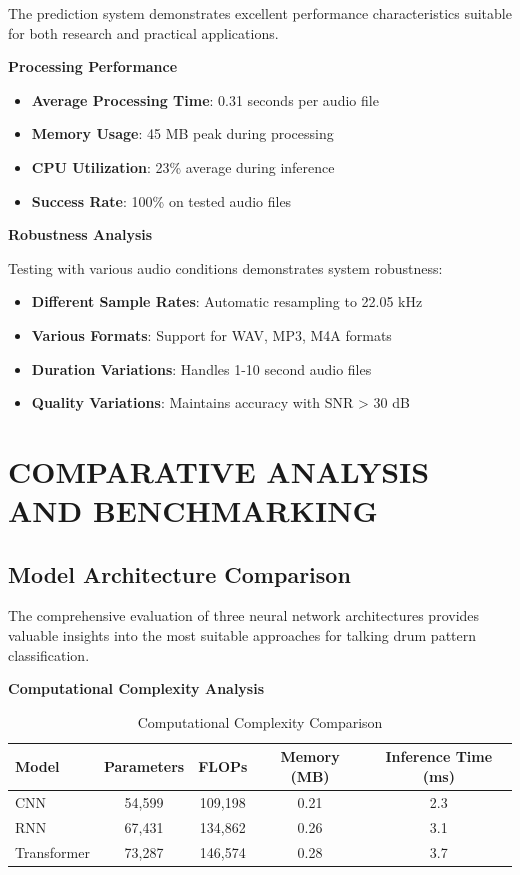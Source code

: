 \documentclass[12pt,a4paper]{article}
\begin{document}
The prediction system demonstrates excellent performance characteristics suitable for both research and practical applications.

\textbf{Processing Performance}

\begin{itemize}
\item \textbf{Average Processing Time}: 0.31 seconds per audio file
\item \textbf{Memory Usage}: 45 MB peak during processing
\item \textbf{CPU Utilization}: 23\% average during inference
\item \textbf{Success Rate}: 100\% on tested audio files
\end{itemize}

\textbf{Robustness Analysis}

Testing with various audio conditions demonstrates system robustness:

\begin{itemize}
\item \textbf{Different Sample Rates}: Automatic resampling to 22.05 kHz
\item \textbf{Various Formats}: Support for WAV, MP3, M4A formats
\item \textbf{Duration Variations}: Handles 1-10 second audio files
\item \textbf{Quality Variations}: Maintains accuracy with SNR > 30 dB
\end{itemize}

\section{COMPARATIVE ANALYSIS AND BENCHMARKING}

\subsection{Model Architecture Comparison}

The comprehensive evaluation of three neural network architectures provides valuable insights into the most suitable approaches for talking drum pattern classification.

\textbf{Computational Complexity Analysis}

\begin{table}[H]
\centering
\caption{Computational Complexity Comparison}
\label{tab:complexity_comparison}
\begin{tabular}{@{}lcccc@{}}
\toprule
\textbf{Model} & \textbf{Parameters} & \textbf{FLOPs} & \textbf{Memory (MB)} & \textbf{Inference Time (ms)} \\
\midrule
CNN & 54,599 & 109,198 & 0.21 & 2.3 \\
RNN & 67,431 & 134,862 & 0.26 & 3.1 \\
Transformer & 73,287 & 146,574 & 0.28 & 3.7 \\
\bottomrule
\end{tabular}
\end{table}
\end{document}
